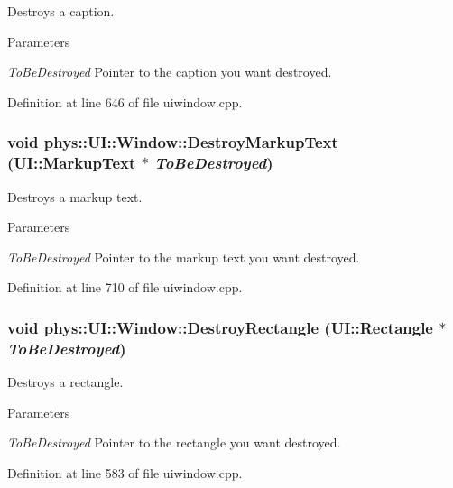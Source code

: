 Destroys a caption. 


\begin{DoxyParams}{Parameters}
\item[{\em ToBeDestroyed}]Pointer to the caption you want destroyed. \end{DoxyParams}


Definition at line 646 of file uiwindow.cpp.

\hypertarget{classphys_1_1UI_1_1Window_aba2506738c7cccfbf8297bf03e431cb8}{
\subsubsection[{DestroyMarkupText}]{\setlength{\rightskip}{0pt plus 5cm}void phys::UI::Window::DestroyMarkupText ({\bf UI::MarkupText} $\ast$ {\em ToBeDestroyed})}}
\label{d4/d86/classphys_1_1UI_1_1Window_aba2506738c7cccfbf8297bf03e431cb8}


Destroys a markup text. 


\begin{DoxyParams}{Parameters}
\item[{\em ToBeDestroyed}]Pointer to the markup text you want destroyed. \end{DoxyParams}


Definition at line 710 of file uiwindow.cpp.

\hypertarget{classphys_1_1UI_1_1Window_ab66c4c1d5f26e3f4fcdd34063b711365}{
\subsubsection[{DestroyRectangle}]{\setlength{\rightskip}{0pt plus 5cm}void phys::UI::Window::DestroyRectangle ({\bf UI::Rectangle} $\ast$ {\em ToBeDestroyed})}}
\label{d4/d86/classphys_1_1UI_1_1Window_ab66c4c1d5f26e3f4fcdd34063b711365}


Destroys a rectangle. 


\begin{DoxyParams}{Parameters}
\item[{\em ToBeDestroyed}]Pointer to the rectangle you want destroyed. \end{DoxyParams}


Definition at line 583 of file uiwindow.cpp.

